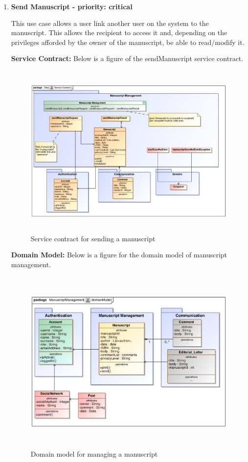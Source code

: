 \begin{enumerate}
\newpage
\item \textbf{Send Manuscript - priority: critical}
\par {This use case allows a user link another user on the system to the manuscript. This allows the recipient to access it and, depending on the privileges afforded by the owner of the manuscript, be able to read/modify it.}

\textbf{Service Contract:} Below is a figure of the sendManuscript service contract.

\begin{figure}[h]
\includegraphics[height=330px, width=500px]{epsImages/ManuscriptManagement/sendManuscriptServiceContract.eps}
\caption{Service contract for sending a manuscript}
\end{figure}
 \newpage
\textbf{Domain Model:} Below is a figure for the domain model of manuscript management. 

 \begin{figure}[h]
\includegraphics[height=350px, width=500px]{epsImages/DomainModels/ManuscriptManagement.eps}
\caption{Domain model for managing a manuscript}
\end{figure}

\end{enumerate}

